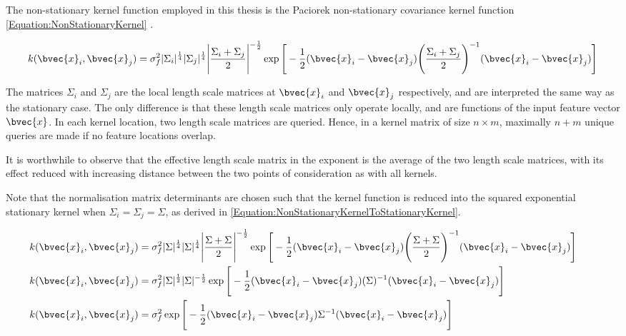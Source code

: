 				The non-stationary kernel function employed in this thesis is the Paciorek non-stationary covariance kernel function \eqref{Equation:NonStationaryKernel} \citep{AdaptiveNonStationaryKernel}.
				
				\begin{equation}
					k(\bvec{x}_{i}, \bvec{x}_{j}) = \sigma_{f}^{2} |\Sigma_{i}|^{\frac{1}{4}} |\Sigma_{j}|^{\frac{1}{4}} \Bigg|\frac{\Sigma_{i} + \Sigma_{j}}{2}\Bigg|^{-\frac{1}{2}} \exp\Bigg[ -\frac{1}{2} (\bvec{x}_{i} - \bvec{x}_{j}) \Bigg(\frac{\Sigma_{i} + \Sigma_{j}}{2}\Bigg)^{-1} (\bvec{x}_{i} - \bvec{x}_{j}) \Bigg]
				\label{Equation:NonStationaryKernel}
				\end{equation}			
				
				The matrices $\Sigma_{i}$ and $\Sigma_{j}$ are the local length scale matrices at $\bvec{x}_{i}$ and $\bvec{x}_{j}$ respectively, and are interpreted the same way as the stationary case. The only difference is that these length scale matrices only operate locally, and are functions of the input feature vector $\bvec{x}$. In each kernel location, two length scale matrices are queried. Hence, in a kernel matrix of size $n \times m$, maximally $n + m$ unique queries are made if no feature locations overlap.
				
				It is worthwhile to observe that the effective length scale matrix in the exponent is the average of the two length scale matrices, with its effect reduced with increasing distance between the two points of consideration as with all kernels.
				
				Note that the normalisation matrix determinants are chosen such that the kernel function is reduced into the squared exponential stationary kernel when $\Sigma_{i} = \Sigma_{j} = \Sigma$, as derived in \eqref{Equation:NonStationaryKernelToStationaryKernel}. 
				
				\begin{equation}
					\left.
						\begin{aligned}
							k(\bvec{x}_{i}, \bvec{x}_{j}) &= \sigma_{f}^{2} |\Sigma|^{\frac{1}{4}} |\Sigma|^{\frac{1}{4}} \Bigg|\frac{\Sigma + \Sigma}{2}\Bigg|^{-\frac{1}{2}} \exp\Bigg[ -\frac{1}{2} (\bvec{x}_{i} - \bvec{x}_{j}) \Bigg(\frac{\Sigma + \Sigma}{2}\Bigg)^{-1} (\bvec{x}_{i} - \bvec{x}_{j}) \Bigg] \\
							k(\bvec{x}_{i}, \bvec{x}_{j}) &= \sigma_{f}^{2} |\Sigma|^{\frac{1}{2}} |\Sigma|^{-\frac{1}{2}} \exp\Bigg[ -\frac{1}{2} (\bvec{x}_{i} - \bvec{x}_{j}) (\Sigma)^{-1} (\bvec{x}_{i} - \bvec{x}_{j}) \Bigg] \\
							k(\bvec{x}_{i}, \bvec{x}_{j}) &= \sigma_{f}^{2} \exp\Bigg[ -\frac{1}{2} (\bvec{x}_{i} - \bvec{x}_{j}) \Sigma^{-1} (\bvec{x}_{i} - \bvec{x}_{j}) \Bigg]
						\end{aligned}
					\qquad \right.
				\label{Equation:NonStationaryKernelToStationaryKernel}
				\end{equation}		
				
